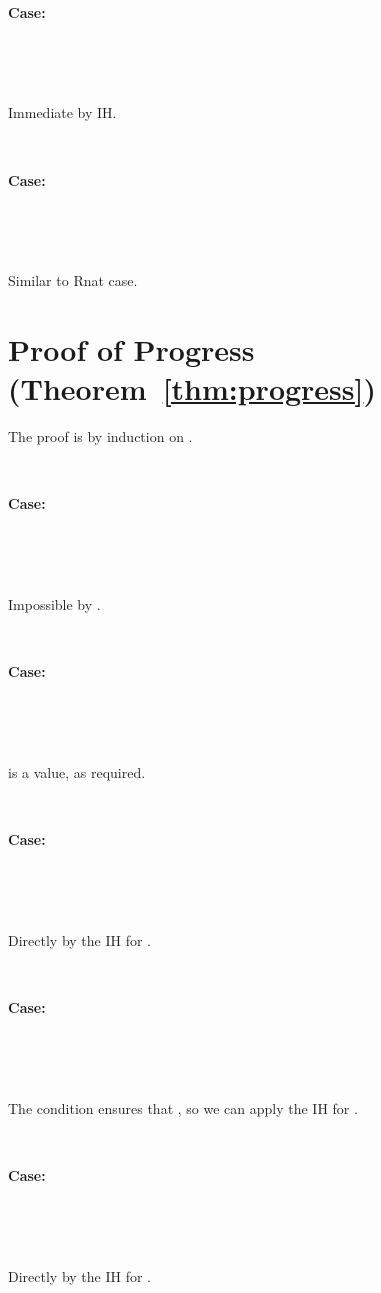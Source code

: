 \documentclass[copyright]{eptcs}
\begin{document}
\ 

\noindent \textbf{Case:}

\



\ 

\noindent Immediate by IH.

\ 

\noindent \textbf{Case:}

\



\ 

\noindent Similar to Rnat case.



\section{Proof of Progress (Theorem~\ref{thm:progress})}
\label{sec:progress}

The proof is by induction on . 


\ 

\noindent \textbf{Case:}

\



\ 

\noindent Impossible by .

\ 

\noindent \textbf{Case:}

\



\ 

\noindent  is a value, as required.

\ 

\noindent \textbf{Case:}

\



\ 

\noindent Directly by the IH for .

\ 

\noindent \textbf{Case:}

\



\ 

\noindent The condition  ensures that , so we can apply the IH for .

\ 

\noindent \textbf{Case:}

\



\ 

\noindent Directly by the IH for .
\end{document}
